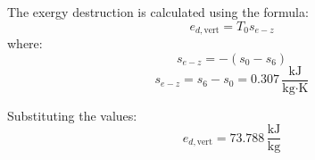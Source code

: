 The exergy destruction is calculated using the formula:  
\[
e_{d,\text{vert}} = T_0 s_{e-z}
\]  
where:  
\[
s_{e-z} = -(s_0 - s_6)
\]  
\[
s_{e-z} = s_6 - s_0 = 0.307 \, \frac{\text{kJ}}{\text{kg·K}}
\]  

Substituting the values:  
\[
e_{d,\text{vert}} = 73.788 \, \frac{\text{kJ}}{\text{kg}}
\]